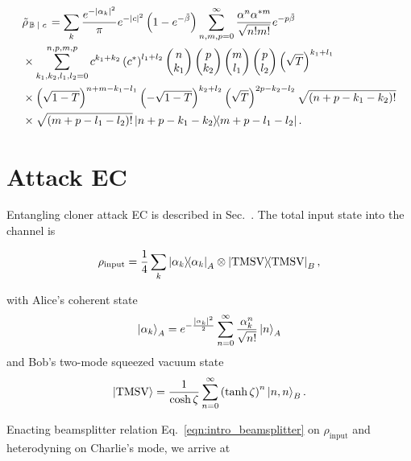 \begin{align}\label{eqn:appendix_bs1_state}
%
&\tilde{\rho}_{\left. \mathbb{B} \given c\right.} = \sum_k \frac{e^{- \left|\alpha_k\right|^2}}{\pi} e^{-\left|c\right|^2} \left( 1 - e^{- \tilde{\beta}}\right) \sum_{n, m, p = 0}^\infty \frac{\alpha^n \alpha^{* m}}{\sqrt{n! m!}} e^{- p \tilde{\beta}}  \notag \\
%
&\times \sum_{k_1, k_2, l_1, l_2=0}^{n, p, m, p} c^{k_1 + k_2} \left(c^*\right)^{l_1 + l_2} \pmqty{n \\ k_1} \pmqty{ p \\ k_2} \pmqty{ m \\ l_1 } \pmqty{p \\ l_2} \left( \sqrt{T} \right)^{k_1 + l_1} \notag \\
%
&\times \left(\sqrt{1-T}\right)^{n + m - k_1 - l_1} \left( - \sqrt{1-T}\right)^{k_2 + l_2} \left( \sqrt{T} \right)^{2 p - k_2 - l_2}\sqrt{\left(n + p - k_1 - k_2\right)!}  \notag \\
%
&\times\sqrt{\left(m + p - l_1 - l_2 \right)!} \dyad{n + p - k_1 - k_2}{m + p - l_1 - l_2}.
%
\end{align}

\section{Attack EC}\label{appendix:ec_state}
Entangling cloner attack EC is described in Sec.~. The total input state into the channel is

\begin{equation}
\rho_{\text{input}} = \frac{1}{4}\sum_k \dyad{\alpha_k}_A \otimes \dyad{\text{TMSV}}_B,
\end{equation}

\noindent with Alice's coherent state
\begin{equation}
\ket{\alpha_k}_A = e^{- \frac{\left| \alpha_k \right|^2}{2}} \sum_{n=0}^\infty \frac{\alpha_k^n}{\sqrt{n!}} \ket{n}_A
\end{equation}
and Bob's two-mode squeezed vacuum state
\begin{equation}
\ket{\text{TMSV}} = \frac{1}{\cosh{\zeta}}\sum_{n=0}^\infty \left(\tanh{\zeta}\right)^n \ket{n, n}_B.
\end{equation}

\noindent Enacting beamsplitter relation Eq.~\ref{eqn:intro_beamsplitter} on $\rho_{\text{input}}$ and heterodyning on Charlie's mode, we arrive at 

